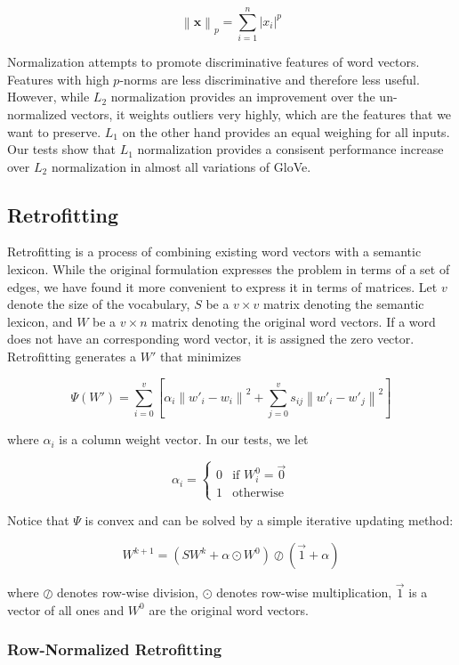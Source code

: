 \documentclass[letterpaper]{article}
\begin{document}
$$ \left\|\mathbf{x}\right\|_p
  = \sum_{i=1}^n \left|x_i\right|^p$$

Normalization attempts to promote discriminative features of word vectors.
Features with high $p$-norms are less discriminative and therefore less useful.
However, while $L_2$ normalization provides an improvement over the un-normalized
vectors, it weights outliers very highly, which are the features that we want to
preserve. $L_1$ on the other hand provides an equal weighing for all inputs.
Our tests show that $L_1$ normalization provides a consisent performance
increase over $L_2$ normalization in almost all variations of GloVe.

\subsection{Retrofitting}

Retrofitting \cite{faruqui2014retrofitting} is a process of combining existing word vectors with a semantic
lexicon. While the original formulation expresses the problem in terms of a set
of edges, we have found it more convenient to express it in terms of matrices.
Let $v$ denote the size of the vocabulary, $S$ be a $v \times v$ matrix
denoting the semantic lexicon, and $W$ be a $v \times n$ matrix denoting the
original word vectors. If a word does not have an
corresponding word vector, it is assigned the zero vector. Retrofitting
generates a $W'$ that minimizes

$$
\Psi \left( W' \right) = \sum_{i=0}^v \left[
  \alpha_i \left\|  w'_i - w_i \right\| ^ 2
  + \sum_{j=0}^v s_{ij} \left\| w'_i - w'_j \right\| ^ 2
\right]
$$

where $\alpha_i$ is a column weight vector. In our tests, we let

$$
\alpha_i =
  \begin{cases}
    0 & \text{if $W^0_i = \vec{0}$} \\
    1 & \text{otherwise}
  \end{cases}
$$

Notice that $\Psi$ is convex and can be solved by a simple iterative updating
method:

$$
W^{k+1} = \left( S W^k + \alpha \odot W^0 \right)
\oslash \left( \vec{1} + \alpha \right)
$$

where $\oslash$ denotes row-wise division, $\odot$ denotes row-wise
multiplication, $\vec{1}$ is a vector of all ones and $W^0$ are the original
word vectors.

\subsubsection{Row-Normalized Retrofitting}
\end{document}
